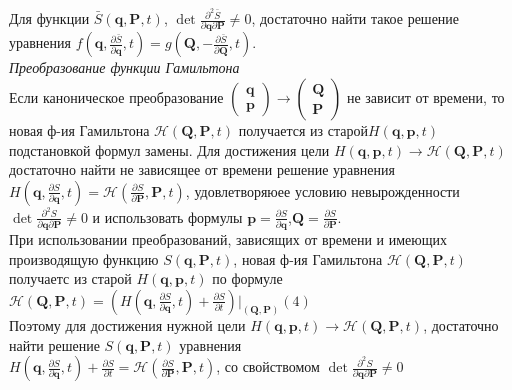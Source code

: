 \documentclass[specialist, subf, href, colorlinks=true, 12pt, times, mtpro, final]{disser}
\theoremstyle{definition}
\begin{document}
Для функции $\bar{S}(\mathbf{q},\mathbf{P}, t)$, $\det \frac{\partial^2 \bar{S}}{\partial \mathbf{q} \partial \mathbf{P}} \neq 0$, достаточно найти такое решение уравнения $f(\mathbf{q}, \frac{\partial \bar{S}}{\partial \mathbf{q}}, t) = g( \mathbf{Q},-\frac{\partial \bar{S}}{\partial \mathbf{Q}}, t).$\\
\textit{Преобразование функции Гамильтона}\\
Если каноническое преобразование $\left (
\begin{matrix}
\mathbf{q}\\ \mathbf{p}
\end{matrix}
\right ) \rightarrow \left (
\begin{matrix}
\mathbf{Q}\\ \mathbf{P}
\end{matrix}
\right )$ не зависит от времени, то новая ф-ия Гамильтона $\mathcal{H}(\mathbf{Q}, \mathbf{P}, t)$ получается из старой$H(\mathbf{q}, \mathbf{p}, t)$ подстановкой формул замены. Для достижения цели $H(\mathbf{q}, \mathbf{p}, t)\rightarrow\mathcal{H}(\mathbf{Q}, \mathbf{P}, t)$ достаточно найти не зависящее от времени решение уравнения \\
$H(\mathbf{q}, \frac{\partial S}{\partial \mathbf{q}}, t) = \mathcal{H}(\frac{\partial S}{\partial \mathbf{P}}, \mathbf{P}, t)$, удовлетворяюее условию невырожденности\\
$\det \frac{\partial^2 S}{\partial \mathbf{q} \partial \mathbf{P}} \neq 0$ и использовать формулы $\mathbf{p} = \frac{\partial S}{\partial \mathbf{q}}$,$
\mathbf{Q} = \frac{\partial S}{\partial \mathbf{P}}.$\\
При использовании преобразований, зависящих от времени и имеющих производящую функцию $S(\mathbf{q},\mathbf{P}, t)$, новая ф-ия Гамильтона $\mathcal{H}(\mathbf{Q}, \mathbf{P}, t)$ получаетс из старой $H(\mathbf{q}, \mathbf{p}, t)$ по формуле\\
 $\mathcal{H}(\mathbf{Q}, \mathbf{P}, t) = (H(\mathbf{q},\frac{\partial S}{\partial \mathbf{q}}, t) + \frac{\partial S}{\partial t})|_{(\mathbf{Q}, \mathbf{P})} (4)$\\
Поэтому для достижения нужной цели $H(\mathbf{q}, \mathbf{p}, t)\rightarrow\mathcal{H}(\mathbf{Q}, \mathbf{P}, t)$, достаточно найти решение $S(\mathbf{q},\mathbf{P}, t)$ уравнения\\
$H(\mathbf{q},\frac{\partial S}{\partial \mathbf{q}}, t) + \frac{\partial S}{\partial t} = \mathcal{H}(\frac{\partial S}{\partial \mathbf{P}}, \mathbf{P}, t)$, со свойствомом $\det \frac{\partial^2 S}{\partial \mathbf{q} \partial \mathbf{P}} \neq 0$\\
\end{document}
